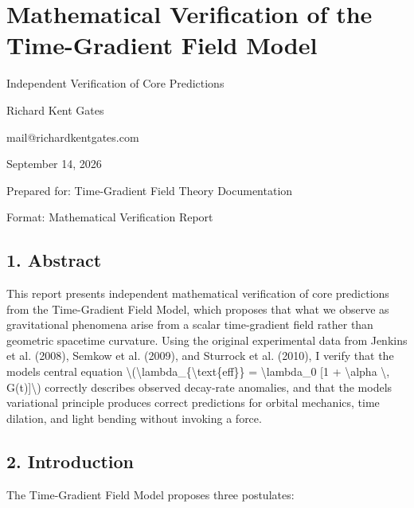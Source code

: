 \documentclass[
  10pt,
]{article}
\author{}
\date{}
\begin{document}
\hypertarget{mathematical-verification-of-the-time-gradient-field-model}{%
\section{Mathematical Verification of the Time-Gradient Field
Model}\label{mathematical-verification-of-the-time-gradient-field-model}}

Independent Verification of Core Predictions

Richard Kent Gates

mail@richardkentgates.com

September 14, 2026

Prepared for: Time-Gradient Field Theory Documentation

Format: Mathematical Verification Report

\hypertarget{abstract}{%
\subsection{1. Abstract}\label{abstract}}

This report presents independent mathematical verification of core
predictions from the Time-Gradient Field Model, which proposes that what
we observe as gravitational phenomena arise from a scalar time-gradient
field rather than geometric spacetime curvature. Using the original
experimental data from Jenkins et al. (2008), Semkow et al. (2009), and
Sturrock et al. (2010), I verify that the model\textquotesingle s
central equation
\textbackslash(\textbackslash lambda\_\{\textbackslash text\{eff\}\} =
\textbackslash lambda\_0 {[}1 + \textbackslash alpha \textbackslash,
G(t){]}\textbackslash) correctly describes observed decay-rate
anomalies, and that the model\textquotesingle s variational principle
produces correct predictions for orbital mechanics, time dilation, and
light bending without invoking a force.

\hypertarget{introduction}{%
\subsection{2. Introduction}\label{introduction}}

The Time-Gradient Field Model proposes three postulates:
\end{document}
